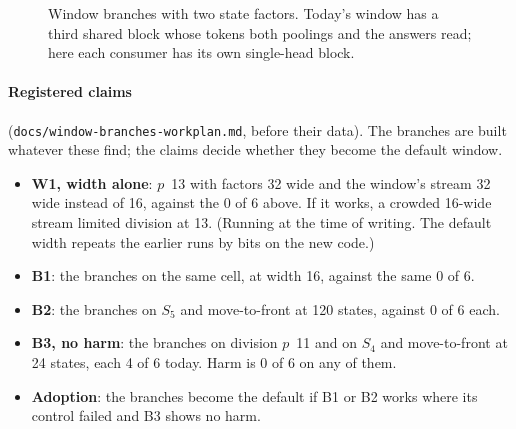 \documentclass[11pt]{article}
\begin{document}
\begin{figure}[t]
\centering
{}
\caption{Window branches with two state factors. Today's window has a third shared block whose
tokens both poolings and the answers read; here each consumer has its own single-head block.}
\label{fig:branches}
\end{figure}

\paragraph{Registered claims} (\texttt{docs/window-branches-workplan.md}, before their data). The
branches are built whatever these find; the claims decide whether they become the default window.
\begin{itemize}
\item \textbf{W1, width alone}: $p$~13 with factors 32 wide and the window's stream 32 wide instead
  of 16, against the 0 of 6 above. If it works, a crowded 16-wide stream limited division at 13.
  (Running at the time of writing. The default width repeats the earlier runs by bits on the new
  code.)
\item \textbf{B1}: the branches on the same cell, at width 16, against the same 0 of 6.
\item \textbf{B2}: the branches on $S_5$ and move-to-front at 120 states, against 0 of 6 each.
\item \textbf{B3, no harm}: the branches on division $p$~11 and on $S_4$ and move-to-front at 24
  states, each 4 of 6 today. Harm is 0 of 6 on any of them.
\item \textbf{Adoption}: the branches become the default if B1 or B2 works where its control failed
  and B3 shows no harm.
\end{itemize}
\end{document}

